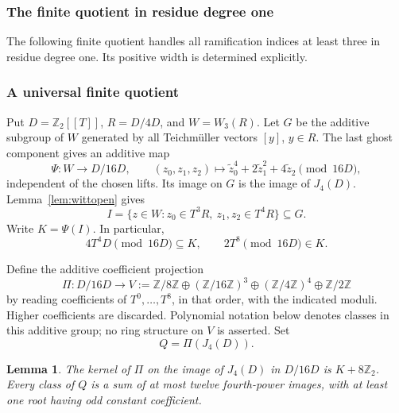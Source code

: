 \documentclass[11pt]{amsart}
\newtheorem{lemma}[theorem]{Lemma}
\theoremstyle{definition}
\numberwithin{equation}{section}
\begin{document}
\subsubsection{The finite quotient in residue degree one}
\label{sec:quartic-conductor}

The following finite quotient handles all ramification indices at least
three in residue degree one. Its positive width is determined explicitly.

\subsubsection{A universal finite quotient}

Put $D=\mathbb Z_2[[T]]$, $R=D/4D$, and
$W=W_3(R)$.  Let $G$ be the additive subgroup of $W$ generated by all
Teichm\"uller vectors $[y]$, $y\in R$.  The last ghost component gives
an additive map
\[
 \Psi:W\longrightarrow D/16D,
 \qquad
 (z_0,z_1,z_2)\longmapsto
 \widetilde z_0^4+2\widetilde z_1^2+4\widetilde z_2\pmod {16D},
\]
independent of the chosen lifts.  Its image on $G$ is the image of
$J_4(D)$.  Lemma~\ref{lem:wittopen} gives
\[
 I=\{z\in W:z_0\in T^3R,\ z_1,z_2\in T^4R\}\subseteq G.
\]
Write $K=\Psi(I)$.  In particular,
\begin{equation}\label{eq:quartic-conductor-basic}
 4T^4D\pmod {16D}\subseteq K,
 \qquad 2T^8\pmod {16D}\in K.
\end{equation}

Define the additive coefficient projection
\[
 \Pi:D/16D\longrightarrow
 V:=\mathbb Z/8\mathbb Z\oplus(\mathbb Z/16\mathbb Z)^3
       \oplus(\mathbb Z/4\mathbb Z)^4\oplus\mathbb Z/2\mathbb Z
\]
by reading coefficients of $T^0,\ldots,T^8$, in that order, with the
indicated moduli.  Higher coefficients are discarded.  Polynomial
notation below denotes classes in this additive group; no ring
structure on $V$ is asserted.  Set
\[
 Q=\Pi(J_4(D)).
\]

\begin{lemma}\label{lem:quartic-universal-quotient}
The kernel of $\Pi$ on the image of $J_4(D)$ in $D/16D$ is
$K+8\mathbb Z_2$.  Every class of $Q$ is a sum of at most twelve
fourth-power images, with at least one root having odd constant
coefficient.
\end{lemma}
\end{document}
